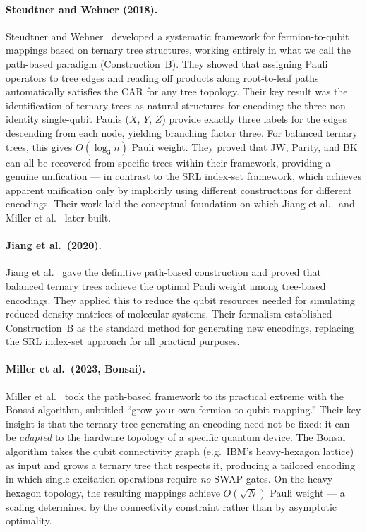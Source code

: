 \paragraph{Steudtner and Wehner (2018).}
Steudtner and Wehner~\cite{steudtner2018} developed a systematic
framework for fermion-to-qubit mappings based on ternary tree
structures, working entirely in what we call the path-based paradigm
(Construction~B).  They showed that assigning Pauli operators to tree
edges and reading off products along root-to-leaf paths automatically
satisfies the CAR for any tree topology.  Their key result was the
identification of ternary trees as natural structures for encoding:
the three non-identity single-qubit Paulis ($X$, $Y$, $Z$) provide
exactly three labels for the edges descending from each node, yielding
branching factor three.  For balanced ternary trees, this gives
$O(\log_3 n)$ Pauli weight.  They proved that JW, Parity, and BK can
all be recovered from specific trees within their framework, providing
a genuine unification --- in contrast to the SRL index-set framework,
which achieves apparent unification only by implicitly using different
constructions for different encodings.  Their work laid the conceptual
foundation on which Jiang et al.~\cite{jiang2020} and Miller et
al.~\cite{miller2023bonsai} later built.

\paragraph{Jiang et al.\ (2020).}
Jiang et al.~\cite{jiang2020} gave the definitive path-based
construction and proved that balanced ternary trees achieve the
optimal Pauli weight among tree-based encodings.  They applied this
to reduce the qubit resources needed for simulating reduced density
matrices of molecular systems.  Their formalism established
Construction~B as the standard method for generating new encodings,
replacing the SRL index-set approach for all practical purposes.

\paragraph{Miller et al.\ (2023, Bonsai).}
Miller et al.~\cite{miller2023bonsai} took the path-based framework
to its practical extreme with the Bonsai algorithm, subtitled ``grow
your own fermion-to-qubit mapping.''  Their key insight is that the
ternary tree generating an encoding need not be fixed: it can be
\emph{adapted} to the hardware topology of a specific quantum device.
The Bonsai algorithm takes the qubit connectivity graph (e.g.\ IBM's
heavy-hexagon lattice) as input and grows a ternary tree that
respects it, producing a tailored encoding in which single-excitation
operations require \emph{no} SWAP gates.  On the heavy-hexagon
topology, the resulting mappings achieve $O(\sqrt{N})$ Pauli weight
--- a scaling determined by the connectivity constraint rather than
by asymptotic optimality.

